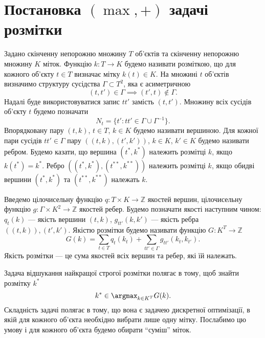 \section{Постановка \((\max,+)\) задачі розмітки}

Задано скінченну непорожню множину $T$ об'єктів та скінченну
непорожню множину $K$ міток. Функцію $k:T\rightarrow K$ будемо
називати розміткою, що для кожного об'єкту $t\in T$ визначає мітку
$k(t)\in K$. На множині $t$ об'єктів визначимо структуру сусідства
$\Gamma \subset T^2$, яка є асиметричною
\begin{equation*}
    (t,t') \in \Gamma\implies (t',t) \notin \Gamma.
\end{equation*}
Надалі буде використовуватися запис $tt'$ замість $(t,t')$. Множину
всіх сусідів об'єкту $t$ будемо позначати
\begin{equation*}
      N_t = \{ t':tt'\in \Gamma \cup \Gamma^{-1}\}.
  \end{equation*}
Впорядковану пару $(t, k)$, $t \in T$, $k \in K$ будемо називати вершиною.
Для кожної пари сусідів $tt'\in\Gamma$ пару $((t,k),(t',k'))$, $k\in K$, $k'\in K$
будемо називати ребром. Будемо казати, що вершина  $(t^*, k^*)$ належить
розмітці $k$, якщо $k(t^*)=k^*$. Ребро $((t^*,k^*),(t^{**},k^{**}))$ належить
розмітці $k$, якщо обидві вершини $(t^*,k^*)$ та $(t^{**},k^{**})$ належать $k$.

Введемо цілочисельну функцію $q:T\times K\rightarrow\mathbb{Z}$ якостей вершин,
цілочисельну функцію $g:\Gamma\times K^2\rightarrow\mathbb{Z}$ якостей ребер. Будемо
позначати якості наступним чином: $q_t(k)$ --- якість вершини $(t,k)$,
$g_{tt'}(k,k')$ --- якість ребра $((t,k)),(t',k')$. Якістю розмітки будемо називати
функцію $G:K^T\rightarrow \mathbb{Z}$
\begin{equation*}
  G(k)=\sum_{t \in T} q_t(k_t) + \sum_{tt' \in \Gamma} g_{tt'}(k_t,k_{t'}).
  \end{equation*}
Якість розмітки --- це сума якостей всіх вершин та ребер, які їй належать.

Задача відшукання найкращої строгої розмітки полягає в тому, щоб знайти
розмітку $k^*$
\begin{equation}
      k^* \in \argmax_{k\in K^T} G(k).
      \label{eqn:strict_labeling}
  \end{equation}
Складність задачі полягає в тому, що
вона є задачею дискретної оптимізації, в якій для кожного об'єкта необхідно
вибрати лише одну мітку. Послабимо цю умову і для кожного об'єкта будемо
обирати ``суміш'' міток.

